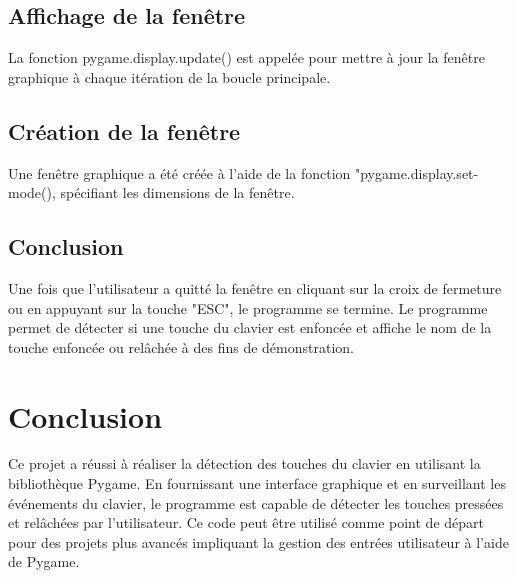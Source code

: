 \documentclass[11pt]{report}
\begin{document}
	\section{Affichage de la fenêtre}
La fonction pygame.display.update() est appelée pour mettre à jour la fenêtre graphique à chaque itération de la boucle principale.
	\section{Création de la fenêtre}
	Une fenêtre graphique a été créée à l'aide de la fonction "pygame.display.set-mode(), spécifiant les dimensions de la fenêtre.
	\section{Conclusion}
	Une fois que l'utilisateur a quitté la fenêtre en cliquant sur la croix de fermeture ou en appuyant sur la touche "ESC", le programme se termine.
	Le programme permet de détecter si une touche du clavier est enfoncée et affiche le nom de la touche enfoncée ou relâchée à des fins de démonstration.
	\chapter{Conclusion}
	Ce projet a réussi à réaliser la détection des touches du clavier en utilisant la bibliothèque Pygame. En fournissant une interface graphique et en surveillant les événements du clavier, le programme est capable de détecter les touches pressées et relâchées par l'utilisateur. Ce code peut être utilisé comme point de départ pour des projets plus avancés impliquant la gestion des entrées utilisateur à l'aide de Pygame.
	
\end{document}
